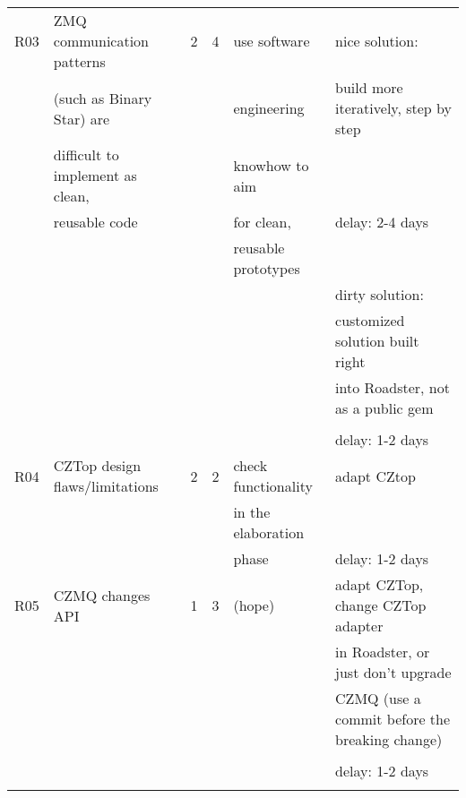 \begin{center}
\begin{longtable}{|p{0.5cm}|p{5.1cm}|p{0.17cm}|p{0.17cm}|p{2.97cm}|p{5.7cm}|}
	R03 & ZMQ communication patterns		& \cellcolor{yellow!50}2 	& \cellcolor{yellow!50}4 	& use software 		& nice solution: 						\\
		& (such as Binary Star) are 		& \cellcolor{yellow!50} 	& \cellcolor{yellow!50}		& engineering 		& build more iteratively, step by step 	\\
		& difficult to implement as clean, 	& \cellcolor{yellow!50} 	& \cellcolor{yellow!50}		& knowhow to aim 	& 										\\
		& reusable code						& \cellcolor{yellow!50} 	& \cellcolor{yellow!50}		& for clean, 		& delay: 2-4 days						\\ 
		&									& \cellcolor{yellow!50} 	& \cellcolor{yellow!50}		& reusable prototypes & 										\\
		&									& \cellcolor{yellow!50} 	& \cellcolor{yellow!50}		&					& dirty solution: 						\\
		&									& \cellcolor{yellow!50} 	& \cellcolor{yellow!50}		&					& customized solution built right		\\
		&									& \cellcolor{yellow!50} 	& \cellcolor{yellow!50}		&					& into Roadster, not as a public gem	\\
		&									& \cellcolor{yellow!50} 	& \cellcolor{yellow!50}		&					& 										\\
		&									& \cellcolor{yellow!50} 	& \cellcolor{yellow!50}		&					& delay: 1-2 days 						\\ \hline
		
	R04	& CZTop design flaws/limitations 	& \cellcolor{yellow!50}2	& \cellcolor{yellow!50}2 	& check functionality & adapt CZtop							\\
		&									& \cellcolor{yellow!50}		& \cellcolor{yellow!50}		& in the elaboration &										\\
		&									& \cellcolor{yellow!50}		& \cellcolor{yellow!50}		& phase				& delay: 1-2 days						\\ \hline
		
	R05 & CZMQ changes API  				& \cellcolor{yellow!50}1 	& \cellcolor{yellow!50}3 	& (hope) 			& adapt CZTop, change CZTop adapter 	\\
		&					  				& \cellcolor{yellow!50} 	& \cellcolor{yellow!50} 	& 		 			& in Roadster, or just don't upgrade	\\
		&					  				& \cellcolor{yellow!50} 	& \cellcolor{yellow!50} 	& 		 			& CZMQ (use a commit before the breaking change)	\\
		&					  				& \cellcolor{yellow!50} 	& \cellcolor{yellow!50} 	& 		 			& 													\\
		&					  				& \cellcolor{yellow!50} 	& \cellcolor{yellow!50} 	& 		 			& delay: 1-2 days 									\\ \hline	\\
		

\end{longtable}
\end{center}
